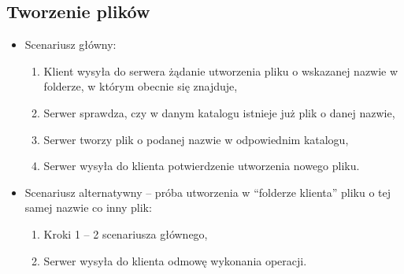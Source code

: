 \documentclass[8pt,a4paper]{article}
\newcommand{\quotes}[1]{``#1''}
\begin{document}
\subsection{Tworzenie plików}
\begin{itemize}
    \item Scenariusz główny:
    \begin{enumerate}
        \item Klient wysyła do serwera żądanie utworzenia pliku o wskazanej nazwie w folderze, w którym obecnie się znajduje,
        \item Serwer sprawdza, czy w danym katalogu istnieje już plik o danej nazwie,
        \item Serwer tworzy plik o podanej nazwie w odpowiednim katalogu,
        \item Serwer wysyła do klienta potwierdzenie utworzenia nowego pliku.
    \end{enumerate}

    \item Scenariusz alternatywny -- próba utworzenia w \quotes{folderze klienta} pliku o tej samej nazwie co inny plik:
    \begin{enumerate}
        \item Kroki 1 -- 2 scenariusza głównego,
        \item Serwer wysyła do klienta odmowę wykonania operacji.
    \end{enumerate}
\end{itemize}
\end{document}
